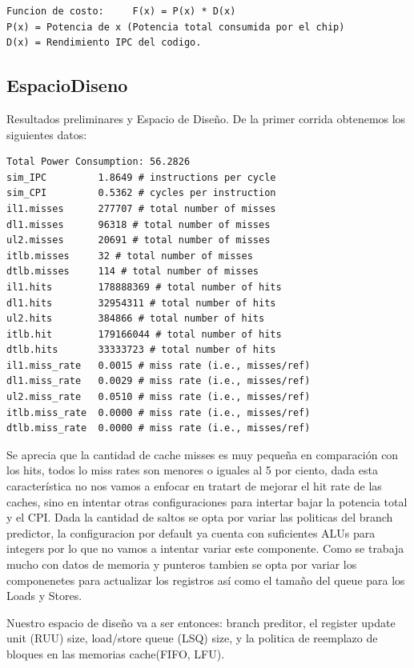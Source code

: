 \documentclass[journal]{IEEEtran}
\begin{document}
\footnotesize \begin{verbatim}
Funcion de costo:     F(x) = P(x) * D(x)
P(x) = Potencia de x (Potencia total consumida por el chip)
D(x) = Rendimiento IPC del codigo.
\end{verbatim}
\normalsize

\subsection{EspacioDiseno}
Resultados preliminares y Espacio de Dise\~no.
De la primer corrida obtenemos los siguientes datos: \newline
\footnotesize \begin{verbatim}
Total Power Consumption: 56.2826
sim_IPC         1.8649 # instructions per cycle
sim_CPI         0.5362 # cycles per instruction
il1.misses      277707 # total number of misses
dl1.misses      96318 # total number of misses
ul2.misses      20691 # total number of misses
itlb.misses     32 # total number of misses
dtlb.misses     114 # total number of misses
il1.hits        178888369 # total number of hits
dl1.hits        32954311 # total number of hits
ul2.hits        384866 # total number of hits
itlb.hit        179166044 # total number of hits
dtlb.hits       33333723 # total number of hits
il1.miss_rate   0.0015 # miss rate (i.e., misses/ref)
dl1.miss_rate   0.0029 # miss rate (i.e., misses/ref)
ul2.miss_rate   0.0510 # miss rate (i.e., misses/ref)
itlb.miss_rate  0.0000 # miss rate (i.e., misses/ref)
dtlb.miss_rate  0.0000 # miss rate (i.e., misses/ref)
\end{verbatim}
\normalsize

Se aprecia que la cantidad de cache misses es muy peque\~na en comparaci\'on con los hits, todos lo miss rates son menores o iguales al 5 por ciento, dada esta caracter\'istica no nos vamos a enfocar en tratart de mejorar el hit rate de las caches, sino en intentar otras configuraciones para intertar bajar la potencia total y el CPI.
Dada la cantidad de saltos se opta por variar las politicas del branch predictor, la configuracion por default ya cuenta con suficientes ALUs para integers por lo que no vamos a intentar variar este componente.  Como se trabaja mucho con datos de memoria y punteros tambien se opta por variar los componenetes para actualizar los registros as\'i como el tama\~no del queue para los Loads y Stores.

Nuestro espacio de dise\~no va a ser entonces: branch preditor, el register update unit (RUU) size, load/store queue (LSQ) size, y la politica de reemplazo de bloques en las memorias cache(FIFO, LFU).
\end{document}
